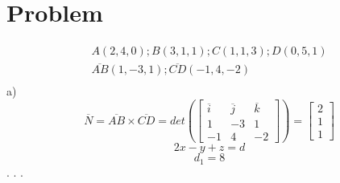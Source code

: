 \documentclass[11pt]{article}
\begin{document}
    \section{Problem}
    \begin{gather*}
        A(2,4,0); B(3,1,1); C(1,1,3); D(0,5,1)\\
        \overline{AB}(1,-3,1); \overline{CD}(-1,4,-2)\\
    \end{gather*}
    a) \newline %
    \[\overline{N}=\overline{AB}\times\overline{CD}=det(\begin{bmatrix}
                                                        \overline{i} & \overline{j} & \overline{k}\\
                                                         1 & -3 &  1 \\
                                                        -1 &  4 & -2
    \end{bmatrix}) = \begin{bmatrix}
                      2  \\
                      1 \\
                      1
    \end{bmatrix} \]
    \[2x-y+z=d\]
    \[d_1=8\]
    . . .
\end{document}
